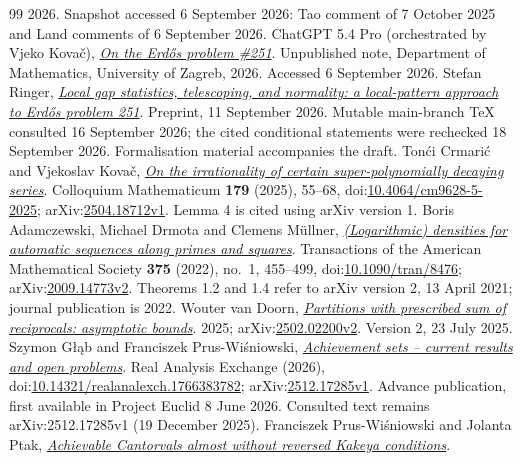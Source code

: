 \documentclass[11pt]{article}
\begin{document}
\begin{thebibliography}{99}
  2026. Snapshot accessed 6 September 2026: Tao comment of 7 October 2025 and Land comments of 6 September 2026.
 {ChatGPT 5.4 Pro (orchestrated by Vjeko Kova\v{c})}, \href{https://web.math.pmf.unizg.hr/~vjekovac/files/Erdos_problem_251.pdf}{\emph{On the Erd\H{o}s problem \#251}}.
  Unpublished note, Department of Mathematics, University of Zagreb, 2026. Accessed 6 September 2026.
 Stefan Ringer, \href{https://github.com/StefanRinger/erdos-251}{\emph{Local gap statistics, telescoping, and normality: a local-pattern approach to Erd\H{o}s problem 251}}.
  Preprint, 11 September 2026. Mutable main-branch TeX consulted 16 September 2026; the cited conditional statements were rechecked 18 September 2026. Formalisation material accompanies the draft.
 Ton\'{c}i Crmari\'{c} and Vjekoslav Kova\v{c}, \href{https://arxiv.org/abs/2504.18712v1}{\emph{On the irrationality of certain super-polynomially decaying series}}.
  Colloquium Mathematicum \textbf{179} (2025), 55--68, doi:\href{https://doi.org/10.4064/cm9628-5-2025}{10.4064/cm9628-5-2025}; arXiv:\href{https://arxiv.org/abs/2504.18712v1}{2504.18712v1}. Lemma 4 is cited using arXiv version 1.
 Boris Adamczewski, Michael Drmota and Clemens M\"ullner, \href{https://arxiv.org/abs/2009.14773v2}{\emph{(Logarithmic) densities for automatic sequences along primes and squares}}.
  Transactions of the American Mathematical Society \textbf{375} (2022), no.~1, 455--499, doi:\href{https://doi.org/10.1090/tran/8476}{10.1090/tran/8476}; arXiv:\href{https://arxiv.org/abs/2009.14773v2}{2009.14773v2}. Theorems 1.2 and 1.4 refer to arXiv version 2, 13 April 2021; journal publication is 2022.
 Wouter van Doorn, \href{https://arxiv.org/abs/2502.02200v2}{\emph{Partitions with prescribed sum of reciprocals: asymptotic bounds}}.
  2025; arXiv:\href{https://arxiv.org/abs/2502.02200v2}{2502.02200v2}. Version 2, 23 July 2025. 
 Szymon G{\l}\k{a}b and Franciszek Prus-Wi\'sniowski, \href{https://arxiv.org/abs/2512.17285v1}{\emph{Achievement sets -- current results and open problems}}.
  Real Analysis Exchange (2026), doi:\href{https://doi.org/10.14321/realanalexch.1766383782}{10.14321/realanalexch.1766383782}; arXiv:\href{https://arxiv.org/abs/2512.17285v1}{2512.17285v1}. Advance publication, first available in Project Euclid 8 June 2026. Consulted text remains arXiv:2512.17285v1 (19 December 2025).
 Franciszek Prus-Wi\'sniowski and Jolanta Ptak, \href{https://arxiv.org/abs/2412.08768v1}{\emph{Achievable Cantorvals almost without reversed Kakeya conditions}}.

\end{thebibliography}
\end{document}
